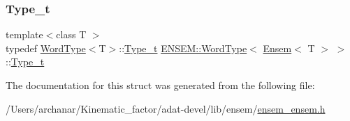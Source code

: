 \subsubsection{\texorpdfstring{Type\_t}{Type\_t}\hspace{0.1cm}{\footnotesize\ttfamily [3/3]}}
{\footnotesize\ttfamily template$<$class T $>$ \\
typedef \mbox{\hyperlink{structENSEM_1_1WordType}{Word\+Type}}$<$T$>$\+::\mbox{\hyperlink{structENSEM_1_1WordType_3_01Ensem_3_01T_01_4_01_4_af525fac697967b39c1ab3356734aeed7}{Type\+\_\+t}} \mbox{\hyperlink{structENSEM_1_1WordType}{E\+N\+S\+E\+M\+::\+Word\+Type}}$<$ \mbox{\hyperlink{classENSEM_1_1Ensem}{Ensem}}$<$ T $>$ $>$\+::\mbox{\hyperlink{structENSEM_1_1WordType_3_01Ensem_3_01T_01_4_01_4_af525fac697967b39c1ab3356734aeed7}{Type\+\_\+t}}}



The documentation for this struct was generated from the following file\+:\begin{DoxyCompactItemize}
\item 
/\+Users/archanar/\+Kinematic\+\_\+factor/adat-\/devel/lib/ensem/\mbox{\hyperlink{adat-devel_2lib_2ensem_2ensem__ensem_8h}{ensem\+\_\+ensem.\+h}}\end{DoxyCompactItemize}
